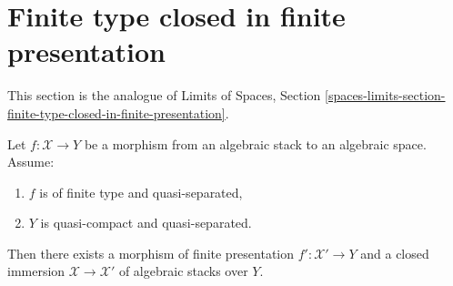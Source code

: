 \section{Finite type closed in finite presentation}
\label{section-finite-type-closed-in-finite-presentation}

\noindent
This section is the analogue of
Limits of Spaces, Section
\ref{spaces-limits-section-finite-type-closed-in-finite-presentation}.

\begin{lemma}
\label{lemma-finite-type-closed-in-finite-presentation}
Let $f : \mathcal{X} \to Y$ be a morphism from an algebraic stack
to an algebraic space. Assume:
\begin{enumerate}
\item $f$ is of finite type and quasi-separated,
\item $Y$ is quasi-compact and quasi-separated.
\end{enumerate}
Then there exists a morphism of finite presentation
$f' : \mathcal{X}' \to Y$ and a closed immersion
$\mathcal{X} \to \mathcal{X}'$ of
algebraic stacks over $Y$.
\end{lemma}

